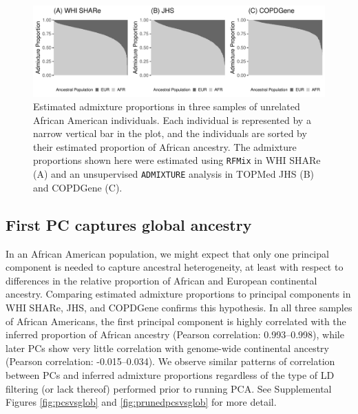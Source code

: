 \documentclass[12pt]{article}
\newcommand{\add}[1]{{\color{red}{[... #1 ...]}}}
\begin{document}
\begin{figure}
\center
\includegraphics[width=\textwidth]{figs/finalfigs/fig1_barplots_greyscale}
\caption{Estimated admixture proportions in three samples of unrelated African American individuals. Each individual is represented by a narrow vertical bar in the plot, and the individuals are sorted by their estimated proportion of African ancestry. The admixture proportions shown here were estimated using \texttt{RFMix} in WHI SHARe (A) and an unsupervised \texttt{ADMIXTURE} analysis in TOPMed JHS (B) and COPDGene (C).}
\label{fig:barplots}
\end{figure}



\subsection{First PC captures global ancestry}



In an African American population, we might expect that only one principal component is needed to capture ancestral heterogeneity, at least with respect to differences in the relative proportion of African and European continental ancestry. 
Comparing estimated admixture proportions to principal components in WHI SHARe, JHS, and COPDGene confirms this hypothesis. 
In all three samples of African Americans, the first principal component is highly correlated with the inferred proportion of African ancestry (Pearson correlation: 0.993--0.998), while later PCs show very little correlation with genome-wide continental ancestry (Pearson correlation: -0.015--0.034).  %
We observe similar patterns of correlation between PCs and inferred admixture proportions regardless of the type of LD filtering (or lack thereof) performed prior to running PCA.
See Supplemental Figures \ref{fig:pcsvsglob} and \ref{fig:prunedpcsvsglob} for more detail. 
\end{document}
